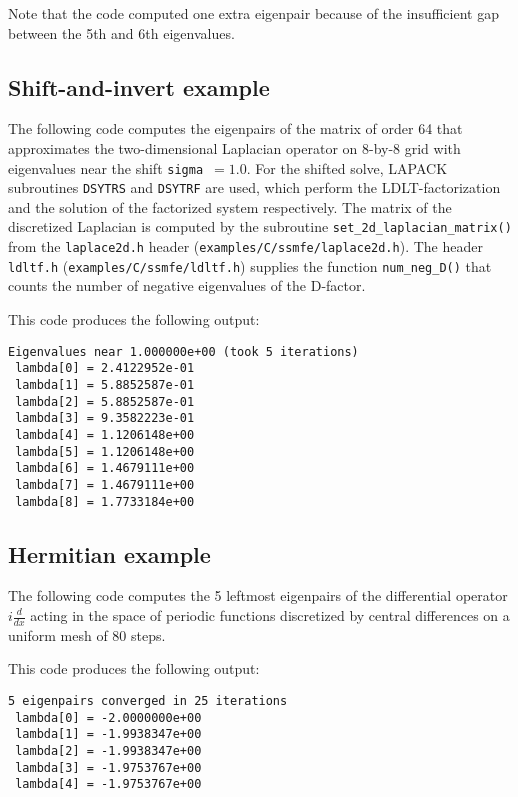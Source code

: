 Note that the code computed one extra eigenpair
because of the insufficient gap between the 5th and 6th
eigenvalues.

\subsection{Shift-and-invert example}

The following code 
computes the eigenpairs of 
the matrix of order 64 that approximates 
the two-dimensional Laplacian operator
on 8-by-8 grid
with eigenvalues near the shift {\tt sigma $=1.0$}.
For the shifted solve, LAPACK subroutines {\tt DSYTRS} and
{\tt DSYTRF} are used,
which perform the LDLT-factorization and
the solution of the factorized system respectively.
The matrix of the discretized Laplacian is computed
by the subroutine {\tt set\_2d\_laplacian\_matrix()}
from the {\tt laplace2d.h} header (\texttt{examples/C/ssmfe/laplace2d.h}).
The header {\tt ldltf.h} (\texttt{examples/C/ssmfe/ldltf.h}) supplies
the function {\tt num\_neg\_D()}
that counts the number of negative eigenvalues of
the D-factor.

This code produces the following output:
\begin{verbatim}
Eigenvalues near 1.000000e+00 (took 5 iterations)
 lambda[0] = 2.4122952e-01
 lambda[1] = 5.8852587e-01
 lambda[2] = 5.8852587e-01
 lambda[3] = 9.3582223e-01
 lambda[4] = 1.1206148e+00
 lambda[5] = 1.1206148e+00
 lambda[6] = 1.4679111e+00
 lambda[7] = 1.4679111e+00
 lambda[8] = 1.7733184e+00
\end{verbatim}

\subsection{Hermitian example}

The following code 
computes the 5 leftmost eigenpairs of 
the differential operator $i \frac{d}{dx}$
acting in the space of periodic functions
discretized by central differences on a uniform mesh
of 80 steps.

This code produces the following output:
\begin{verbatim}
5 eigenpairs converged in 25 iterations
 lambda[0] = -2.0000000e+00
 lambda[1] = -1.9938347e+00
 lambda[2] = -1.9938347e+00
 lambda[3] = -1.9753767e+00
 lambda[4] = -1.9753767e+00
\end{verbatim}

